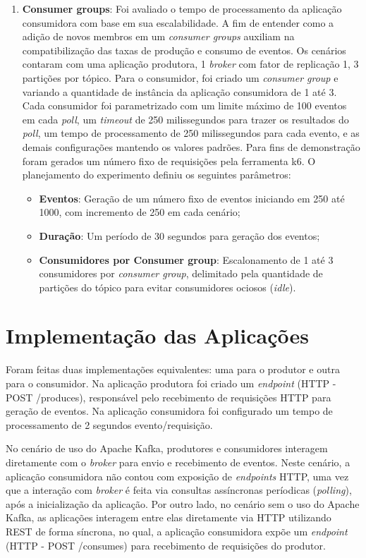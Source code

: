 \documentclass[12pt]{article}
\begin{document}
\begin{enumerate}
    \item \textbf{Consumer groups}: Foi avaliado o tempo de processamento da aplicação consumidora com base em sua escalabilidade. A fim de entender como a adição de novos membros em um \textit{consumer groups} auxiliam na compatibilização das taxas de produção e consumo de eventos. Os cenários contaram com uma aplicação produtora, 1 \textit{broker} com fator de replicação 1, 3 partições por tópico. Para o consumidor, foi criado um \textit{consumer group} e variando a quantidade de instância da aplicação consumidora de 1 até 3. Cada consumidor foi parametrizado com um limite máximo de 100 eventos em cada \textit{poll}, um \textit{timeout} de 250 milissegundos para trazer os resultados do \textit{poll}, um tempo de processamento de 250 milissegundos para cada evento, e as demais configurações mantendo os valores padrões. Para fins de demonstração foram gerados um número fixo de requisições pela ferramenta k6. O planejamento do experimento definiu os seguintes parâmetros:
    \begin{itemize}
      \item \textbf{Eventos}: Geração de um número fixo de eventos iniciando em 250 até 1000, com incremento de 250 em cada cenário;
      \item \textbf{Duração}: Um período de 30 segundos para geração dos eventos;
      \item \textbf{Consumidores por Consumer group}: Escalonamento de 1 até 3 consumidores por \textit{consumer group}, delimitado pela quantidade de partições do tópico para evitar consumidores ociosos (\textit{idle}).
    \end{itemize}
  \end{enumerate}


  \section{Implementação das Aplicações}
  Foram feitas duas implementações equivalentes: uma para o produtor e outra para o consumidor. Na aplicação produtora foi criado um \textit{endpoint} (HTTP - POST /produces), responsável pelo recebimento de requisições HTTP para geração de eventos. Na aplicação consumidora foi configurado um tempo de processamento de 2 segundos evento/requisição.

  No cenário de uso do Apache Kafka, produtores e consumidores interagem diretamente com o \textit{broker} para envio e recebimento de eventos. Neste cenário, a aplicação consumidora não contou com exposição de \textit{endpoints} HTTP, uma vez que a interação com \textit{broker} é feita via consultas assíncronas períodicas (\textit{polling}), após a inicialização da aplicação. Por outro lado, no cenário sem o uso do Apache Kafka, as aplicações interagem entre elas diretamente via HTTP utilizando REST de forma síncrona, no qual, a aplicação consumidora expõe um \textit{endpoint} (HTTP - POST /consumes) para recebimento de requisições do produtor.
\end{document}
